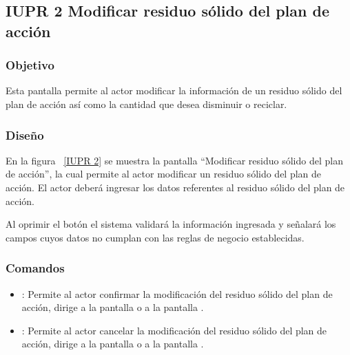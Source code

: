 \subsection{IUPR 2 Modificar residuo sólido del plan de acción}

\subsubsection{Objetivo}

      Esta pantalla permite al actor modificar la información de un residuo sólido del plan de acción así como la cantidad que desea disminuir o reciclar.

\subsubsection{Diseño}
    
    En la figura ~\ref{IUPR 2} se muestra la pantalla ``Modificar residuo sólido del plan de acción'', la cual permite al actor modificar un residuo sólido del plan de acción. 
    El actor deberá ingresar los datos referentes al residuo sólido del plan de acción.\\
 
  
    Al oprimir el botón  el sistema validará la información ingresada y señalará los campos cuyos datos no cumplan con las reglas de negocio establecidas.\\
      
    

\subsubsection{Comandos}
    \begin{itemize}
	\item {}: Permite al actor confirmar la modificación del residuo sólido del plan de acción, dirige a la pantalla  o a la pantalla .
	\item {}: Permite al actor cancelar la modificación del residuo sólido del plan de acción, dirige a la pantalla  o a la pantalla .
    \end{itemize}

